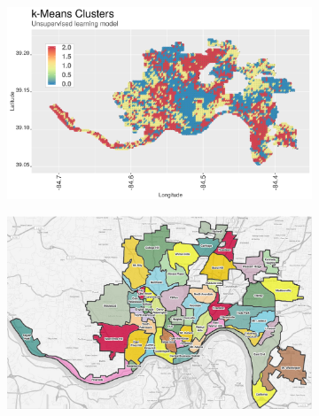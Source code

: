 \documentclass{llncs}
\begin{document}
\FloatBarrier
\begin{figure}
\caption{Cluster results on map of Cincinnati}
\label{figure : PedestrianCosts}
\begin{subfigure}[b]{0.5\textwidth}
\includegraphics[width = \textwidth, height = \textheight, keepaspectratio]{kmeansongrid.png}
\label{figure : kmeansongrid}
\end{subfigure}
%
\begin{subfigure}[b]{0.5\textwidth}
\includegraphics[width = \textwidth, height = \textheight, keepaspectratio]{cinci.png}
\label{figure : cinci}
\end{subfigure}
\end{figure}
\FloatBarrier
\end{document}
